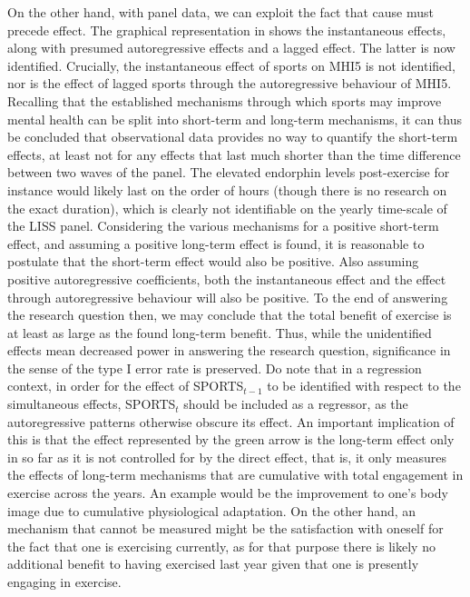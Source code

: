 On the other hand, with panel data, we can exploit the fact that cause must precede effect. The graphical representation
in  shows the instantaneous effects, along with presumed
autoregressive effects and a lagged effect.
The latter is now identified. Crucially, the instantaneous effect of sports on MHI5 is not identified, nor is the effect
of lagged sports through the autoregressive behaviour of MHI5.
Recalling that the established mechanisms through which sports may improve mental health can be split into short-term
and long-term mechanisms, it can thus be concluded that observational data provides no way to quantify the short-term effects,
at least not for any effects that last much shorter than the time difference between two waves of the panel.
The elevated endorphin levels post-exercise for instance would likely last on the order of hours (though there is no
research on the exact duration), which is clearly not identifiable on the yearly time-scale of the LISS panel.
Considering the various mechanisms for a positive short-term effect, and assuming a positive long-term effect is found,
it is reasonable to postulate that the short-term effect would also be positive.
Also assuming positive autoregressive coefficients, both the instantaneous effect and the effect through
autoregressive behaviour will also be positive.
To the end of answering the research question then, we may conclude that the total benefit of exercise is at least
as large as the found long-term benefit. Thus, while the unidentified effects mean decreased power in answering
the research question, significance in the sense of the type I error rate is preserved.
Do note that in a regression context, in order for the effect of SPORTS$_{t-1}$ to be identified with respect to the simultaneous
effects, SPORTS$_t$ should be included as a regressor, as the autoregressive patterns otherwise obscure its effect.
An important implication of this is that the effect represented by the green arrow is the long-term effect
only in so far as it is not controlled for by the direct effect, that is, it only measures the effects of long-term
mechanisms that are cumulative with total engagement in exercise across the years.
An example would be the improvement to one's body image due to cumulative physiological adaptation.
On the other hand, an mechanism that cannot be measured might be the satisfaction with oneself for the fact that
one is exercising currently, as for that purpose there is likely no additional benefit to having exercised
last year given that one is presently engaging in exercise.

